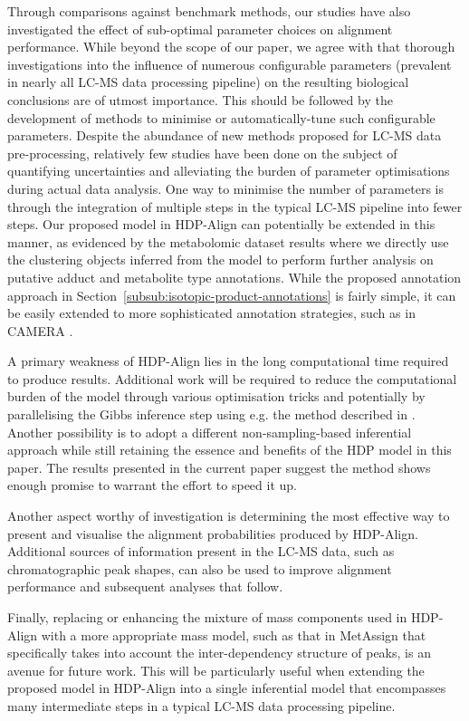 Through comparisons against benchmark methods, our studies have also investigated the effect of sub-optimal parameter choices on alignment performance. While beyond the scope of our paper, we agree with \cite{Smith2013, Smith2013a} that thorough investigations into the influence of numerous configurable parameters (prevalent in nearly all LC-MS data processing pipeline) on the resulting biological conclusions are of utmost importance. This should be followed by the development of methods to minimise or automatically-tune such configurable parameters. Despite the abundance of new methods proposed for LC-MS data pre-processing, relatively few studies have been done on the subject of quantifying uncertainties and alleviating the burden of parameter optimisations during actual data analysis. One way to minimise the number of parameters is through the integration of multiple steps in the typical LC-MS pipeline into fewer steps. Our proposed model in HDP-Align can potentially be extended in this manner, as evidenced by the metabolomic dataset results where we directly use the clustering objects inferred from the model to perform further analysis on putative adduct and metabolite type annotations. While the proposed annotation approach in Section~\ref{subsub:isotopic-product-annotations} is fairly simple, it can be easily extended to more sophisticated annotation strategies, such as in CAMERA \cite{Kuhl2012}. 

A primary weakness of HDP-Align lies in the long computational time required to produce results. Additional work will be required to reduce the computational burden of the model through various optimisation tricks and potentially by parallelising the Gibbs inference step using e.g. the method described in \cite{Lovell2012}. Another possibility is to adopt a different non-sampling-based inferential approach while still retaining the essence and benefits of the HDP model in this paper. The results presented in the current paper suggest the method shows enough promise to warrant the effort to speed it up.

Another aspect worthy of investigation is determining the most effective way to present and visualise the alignment probabilities produced by HDP-Align. Additional sources of information present in the LC-MS data, such as chromatographic peak shapes, can also be used to improve alignment performance and subsequent analyses that follow.

Finally, replacing or enhancing the mixture of mass components used in HDP-Align with a more appropriate mass model, such as that in MetAssign \cite{Daly2014} that specifically takes into account the inter-dependency structure of peaks, is an avenue for future work. This will be particularly useful when extending the proposed model in HDP-Align into a single inferential model that encompasses many intermediate steps in a typical LC-MS data processing pipeline.